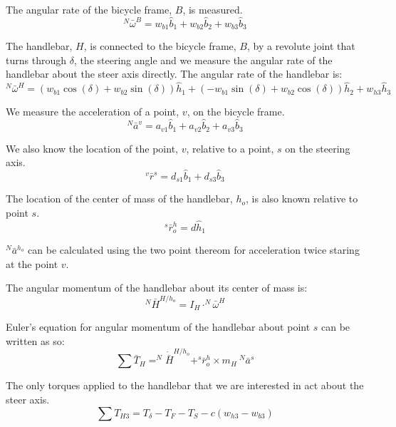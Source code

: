 \documentclass[]{article}
\begin{document}
The angular rate of the bicycle frame, $B$, is measured.
\begin{equation}
  ^N\bar{\omega}^B = w_{b1}\hat{b}_1 + w_{b2}\hat{b}_2 + w_{b3}\hat{b}_3
\end{equation}

The handlebar, $H$, is connected to the bicycle frame, $B$, by a revolute joint
that turns through $\delta$, the steering angle and we measure the angular rate
of the handlebar about the steer axis directly. The angular rate of the
handlebar is:
\begin{equation}
  ^N\bar{\omega}^H = (w_{b1}\cos(\delta) + w_{b2}\sin(\delta))\hat{h}_1 +
    (-w_{b1}\sin(\delta) + w_{b2}\cos(\delta))\hat{h}_2 + w_{h3}\hat{h}_3
\end{equation}

We measure the acceleration of a point, $v$, on the bicycle frame.
\begin{equation}
  ^N\bar{a}^v = a_{v1}\hat{b}_1 + a_{v2}\hat{b}_2 + a_{v3}\hat{b}_3
\end{equation}

We also know the location of the point, $v$, relative to a point, $s$ on the
steering axis.
\begin{equation}
    ^v\bar{r}^s = d_{s1}\hat{b}_1 + d_{s3}\hat{b}_3
\end{equation}

The location of the center of mass of the handlebar, $h_o$, is also known
relative to point $s$.
\begin{equation}
    ^s\bar{r}^h_o = d\hat{h}_1
\end{equation}

$^N\bar{a}^{h_o}$ can be calculated using the two point thereom for
acceleration twice staring at the point $v$.

The angular momentum of the handlebar about its center of mass is:
\begin{equation}
    ^N\bar{H}^{H/h_o} = I_H \cdot ^N\bar{\omega}^H
\end{equation}

Euler's equation for angular momentum of the handlebar about point $s$ can be
written as so:
\begin{equation}
    \sum \bar{T}_H = ^N\dot{\bar{H}}^{H/h_o} + ^s\bar{r}^h_o \times m_H
    \ ^N\bar{a}^s
\end{equation}

The only torques applied to the handlebar that we are interested in act about the steer axis.
\begin{equation}
    \sum T_{H3} = T_\delta - T_F - T_S - c(w_{h3} - w_{b3})
\end{equation}
\end{document}
